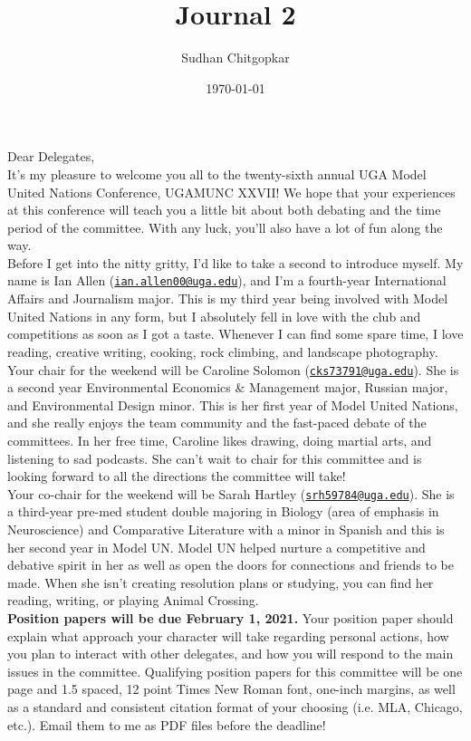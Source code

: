 \documentclass[10pt, letterpaper]{article}
\title{Journal 2}
\author{Sudhan Chitgopkar}
\date{\today}
\begin{document}
        \noindent Dear Delegates, \\
        
        \noindent It’s my pleasure to welcome you all to the twenty-sixth annual UGA Model United Nations Conference, UGAMUNC XXVII! We hope that your experiences at this conference will teach you a little bit about both debating and the time period of the committee. With any luck, you’ll also have a lot of fun along the way. \\
        
        \noindent Before I get into the nitty gritty, I’d like to take a second to introduce myself. My name is Ian Allen (\texttt{\href{mailto:ian.allen00@uga.edu}{ian.allen00@uga.edu}}), and I’m a fourth-year International Affairs and Journalism major. This is my third year being involved with Model United Nations in any form, but I absolutely fell in love with the club and competitions as soon as I got a taste. Whenever I can find some spare time, I love reading, creative writing, cooking, rock climbing, and landscape photography. \\
        
        \noindent Your chair for the weekend will be Caroline Solomon (\texttt{\href{mailto: cks73791@uga.edu}{cks73791@uga.edu}}). She is a second year Environmental Economics \& Management major, Russian major, and Environmental Design minor. This is her first year of Model United Nations, and she really enjoys the team community and the fast-paced debate of the committees. In her free time, Caroline likes drawing, doing martial arts, and listening to sad podcasts. She can’t wait to chair for this committee and is looking forward to all the directions the committee will take! \\
        
        \noindent Your co-chair for the weekend will be Sarah Hartley (\texttt{\href{srh59784@uga.edu}{srh59784@uga.edu}}). She is a third-year pre-med student double majoring in Biology (area of emphasis in Neuroscience) and Comparative Literature with a minor in Spanish and this is her second year in Model UN. Model UN helped nurture a competitive and debative spirit in her as well as open the doors for connections and friends to be made. When she isn’t creating resolution plans or studying, you can find her reading, writing, or playing Animal Crossing. \\
        
        \noindent \textbf{Position papers will be due February 1, 2021.} Your position paper should explain what approach your character will take regarding personal actions, how you plan to interact with other delegates, and how you will respond to the main issues in the committee. Qualifying position papers for this committee will be one page and 1.5 spaced, 12 point Times New Roman font, one-inch margins, as well as a standard and consistent citation format of your choosing (i.e. MLA, Chicago, etc.). Email them to me as PDF files before the deadline! \\
        
\end{document}
